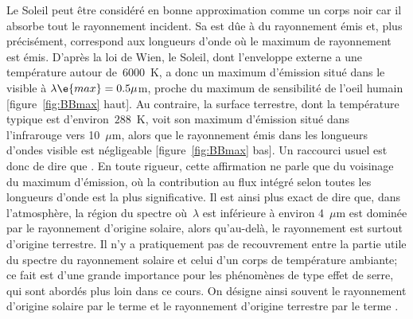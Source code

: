 \sk
Le Soleil peut être considéré en bonne approximation comme un corps noir car il absorbe tout le rayonnement incident. Sa  est dûe à du rayonnement émis et, plus précisément, correspond aux longueurs d'onde où le maximum de rayonnement est émis. D'après la loi de Wien, le Soleil, dont l'enveloppe externe a une température autour de~$6000$~K, a donc un maximum d'émission situé dans le visible à $\lambda\e{max} = 0.5 \mu$m, proche du maximum de sensibilité de l'oeil humain [figure~\ref{fig:BBmax} haut]. Au contraire, la surface terrestre, dont la température typique est d'environ~$288$~K, voit son maximum d'émission situé dans l'infrarouge vers 10~$\mu$m, alors que le rayonnement émis dans les longueurs d'ondes visible est négligeable [figure~\ref{fig:BBmax} bas]. Un raccourci usuel est donc de dire que . En toute rigueur, cette affirmation ne parle que du voisinage du maximum d'émission, où la contribution au flux intégré selon toutes les longueurs d'onde est la plus significative. Il est ainsi plus exact de dire que, dans l'atmosphère, la région du spectre où~$\lambda$ est inférieure à environ 4~$\mu$m est dominée par le rayonnement d'origine solaire, alors qu'au-delà, le rayonnement est surtout d'origine terrestre. Il n’y a pratiquement pas de recouvrement entre la partie utile du spectre du rayonnement solaire et celui d’un corps de température ambiante; ce fait est d'une grande importance pour les phénomènes de type effet de serre, qui sont abordés plus loin dans ce cours. On désigne ainsi souvent le rayonnement d'origine solaire par le terme  et le rayonnement d'origine terrestre par le terme .

